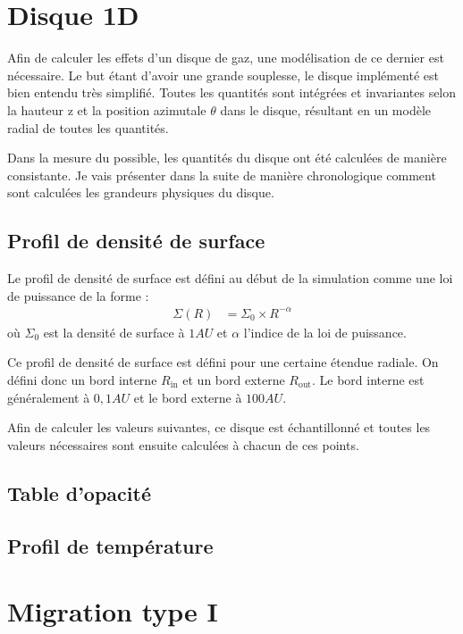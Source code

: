 \documentclass[a4paper,twoside]{report}
\begin{document}

\section{Disque 1D}
Afin de calculer les effets d'un disque de gaz, une modélisation de ce dernier est nécessaire. Le but étant d'avoir une grande souplesse, le disque implémenté est bien entendu très simplifié. Toutes les quantités sont intégrées et invariantes selon la hauteur z et la position azimutale $\theta$ dans le disque, résultant en un modèle radial de toutes les quantités. 

Dans la mesure du possible, les quantités du disque ont été calculées de manière consistante. Je vais présenter dans la suite de manière chronologique comment sont calculées les grandeurs physiques du disque.
\subsection{Profil de densité de surface}
Le profil de densité de surface est défini au début de la simulation comme une loi de puissance de la forme :
\begin{align}
\Sigma(R) &= \Sigma_0 \times R^{-\alpha}
\end{align}
où $\Sigma_0$ est la densité de surface à $1\unit{AU}$ et $\alpha$ l'indice de la loi de puissance. 

Ce profil de densité de surface est défini pour une certaine étendue radiale. On défini donc un bord interne $R_\text{in}$ et un bord externe $R_\text{out}$. Le bord interne est généralement à $0,1\unit{AU}$ et le bord externe à $100\unit{AU}$. 

Afin de calculer les valeurs suivantes, ce disque est échantillonné et toutes les valeurs nécessaires sont ensuite calculées à chacun de ces points. 

\subsection{Table d'opacité}
\subsection{Profil de température}
\section{Migration type I}
\end{document}
